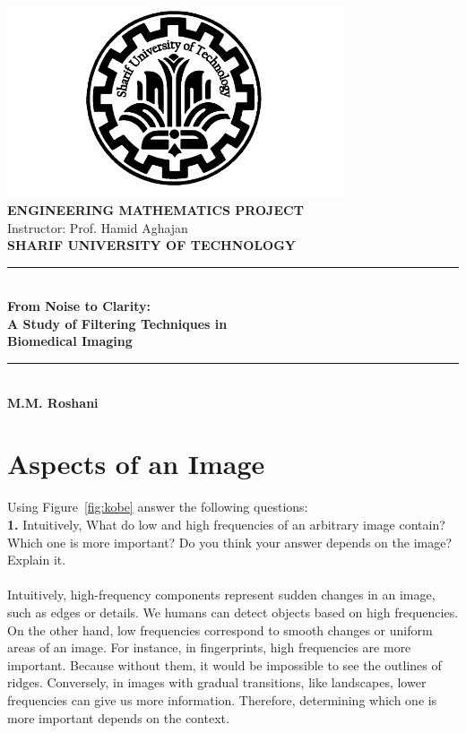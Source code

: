 \documentclass[hidelinks,12pt]{article}
\author{M.M. Roshani}
\begin{document}
	\begin{titlepage}
		\begin{center}
			\includegraphics[width=10cm]{figures/SUT_logo.png} \\
			\vspace{1cm}
			\textbf{\Large ENGINEERING MATHEMATICS PROJECT}\\
			\vspace{0.5cm}
			Instructor: Prof. Hamid Aghajan\\
			\vspace{1cm}
			\textbf{\Large SHARIF UNIVERSITY OF TECHNOLOGY}\\
			\vspace{1cm}
			\rule{\linewidth}{0.5mm} \\
			\vspace{0.5cm}
			{\Huge \textbf{From Noise to Clarity:}}\\
			\vspace{0.3cm}
			{\huge \textbf{A Study of Filtering Techniques in}}\\
			\vspace{0.3cm}
			{\huge \textbf{Biomedical Imaging}}\\
			\rule{\linewidth}{0.5mm} \\
			\vfill
			\textbf{\Large M.M. Roshani}
		\end{center}
	\end{titlepage}
	
	\tableofcontents
	\newpage
	
	\section{Aspects of an Image}
	
	Using Figure~\textcolor{Cyan}{\ref{fig:kobe}} answer the following questions: \\
	
	\textbf{1.} Intuitively, What do low and high frequencies of an arbitrary image contain? Which
	one is more important? Do you think your answer depends on the image? Explain it.
	\\ \\
	 Intuitively, high-frequency components represent sudden changes in an image, such as edges or details. We humans can detect objects based on high frequencies. On the other hand, low frequencies correspond to smooth changes or uniform areas of an image. For instance, in fingerprints, high frequencies are more important. Because without them, it would be impossible to see the outlines of ridges. Conversely, in images with gradual transitions, like landscapes, lower frequencies can give us more information. Therefore, determining which one is more important depends on the context.
	
\end{document}
